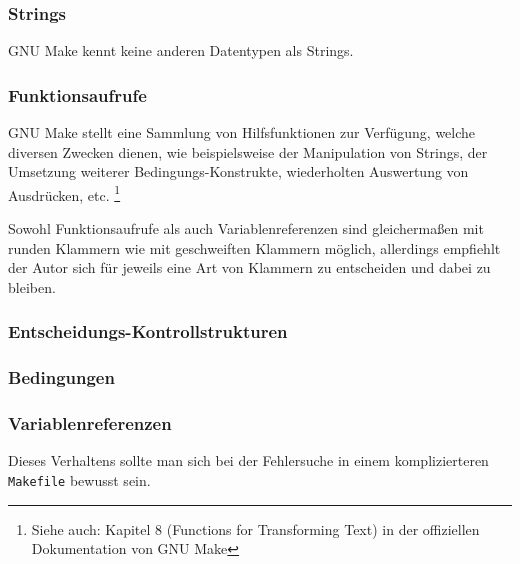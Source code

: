 	\subsubsection*{Strings}  
		
		GNU Make kennt keine anderen Datentypen als Strings.

	\subsubsection*{Funktionsaufrufe}  
		GNU Make stellt eine Sammlung von Hilfsfunktionen zur Verfügung, welche
		diversen Zwecken dienen, wie beispielsweise der Manipulation von
		Strings, der Umsetzung weiterer Bedingungs-Konstrukte, wiederholten
		Auswertung von Ausdrücken, etc.  \footnote{Siehe auch: Kapitel 8 (Functions
		for Transforming Text) in der offiziellen Dokumentation von GNU Make
		}

		Sowohl Funktionsaufrufe als auch Variablenreferenzen sind gleichermaßen
		mit runden Klammern wie mit geschweiften Klammern möglich, allerdings
		empfiehlt der Autor sich für jeweils eine Art von Klammern zu
		entscheiden und dabei zu bleiben.

	\subsubsection*{Entscheidungs-Kontrollstrukturen}	
		

	\subsubsection*{Bedingungen}  
		

	\subsubsection*{Variablenreferenzen}  
		
		\noindent
		Dieses Verhaltens sollte man sich bei der Fehlersuche in einem
		komplizierteren \texttt{Makefile} bewusst sein.

